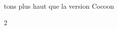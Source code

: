 \textonehalf{}  tons plus haut que la version Cocoon
\xxxstruct

\newpage

\begin{multicols}{2}
    \xxxlyrics

\end{multicols}
